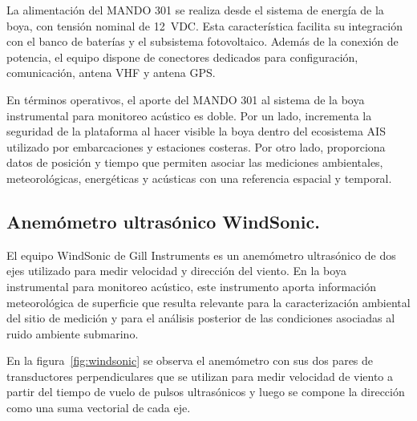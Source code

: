 La alimentación del MANDO 301 se realiza desde el sistema de energía de la boya, con tensión nominal de 12~VDC. Esta característica facilita su integración con el banco de baterías y el subsistema fotovoltaico. Además de la conexión de potencia, el equipo dispone de conectores dedicados para configuración, comunicación, antena VHF y antena GPS. 

En términos operativos, el aporte del MANDO 301 al sistema de la boya instrumental para monitoreo acústico es doble. Por un lado, incrementa la seguridad de la plataforma al hacer visible la boya dentro del ecosistema AIS utilizado por embarcaciones y estaciones costeras. Por otro lado, proporciona datos de posición y tiempo que permiten asociar las mediciones ambientales, meteorológicas, energéticas y acústicas con una referencia espacial y temporal. 

\vspace{10px}
\subsection{Anemómetro ultrasónico WindSonic.}

El equipo WindSonic de Gill Instruments es un anemómetro ultrasónico de dos ejes utilizado para medir velocidad y dirección del viento. En la boya instrumental para monitoreo acústico, este instrumento aporta información meteorológica de superficie que resulta relevante para la caracterización ambiental del sitio de medición y para el análisis posterior de las condiciones asociadas al ruido ambiente submarino. 

En la figura~\ref{fig:windsonic} se observa el anemómetro con sus dos pares de transductores perpendiculares que se utilizan para medir velocidad de viento a partir del tiempo de vuelo de pulsos ultrasónicos y luego se compone la dirección como una suma vectorial de cada eje.

